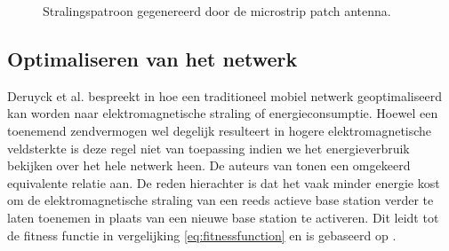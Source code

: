 \documentclass[twocolumn]{phdsymp_dutch}
\begin{document}
\begin{figure}[!htb]
\hfill
{}
  \caption{Stralingspatroon gegenereerd door de microstrip patch antenna.}
\label{fig:radpattern}
\end{figure}


\subsection{Optimaliseren van het netwerk}

Deruyck et al. bespreekt in \cite{J1} hoe een traditioneel mobiel netwerk geoptimaliseerd kan worden naar elektromagnetische straling of energieconsumptie.
Hoewel een toenemend zendvermogen wel degelijk resulteert in hogere elektromagnetische veldsterkte is deze regel niet van 
toepassing indien we het energieverbruik bekijken over het hele netwerk heen. 
De auteurs van \cite{J1} tonen een omgekeerd equivalente relatie aan.
De reden hierachter is dat het vaak minder energie kost om de elektromagnetische straling van een reeds actieve base station 
verder te laten toenemen in plaats van  een nieuwe base station te activeren. Dit leidt tot de fitness functie 
in vergelijking \ref{eq:fitnessfunction} en is gebaseerd op \cite{J1}.
\end{document}
